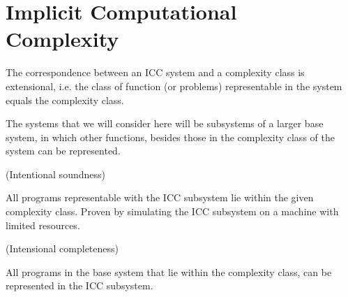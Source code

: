 \chapter{Implicit Computational Complexity}





The correspondence between an ICC system and a complexity class is extensional,
i.e. the class of function (or problems) representable in the system equals the
complexity class.


The systems that we will consider here will be subsystems of a larger base
system, in which other functions, besides those in the complexity class of the
system can be represented.

\begin{definition} (Intentional soundness)

All programs representable with the ICC subsystem lie within the given
complexity class. Proven by simulating the ICC subsystem on a machine with
limited resources.

\end{definition}

\begin{definition} (Intensional completeness)

All programs in the base system that lie within the complexity class, can be
represented in the ICC subsystem.

\end{definition}

